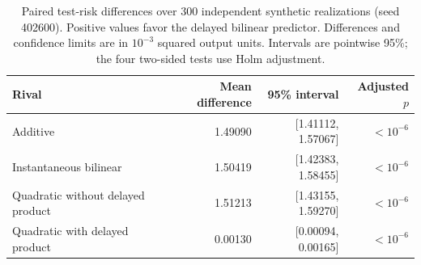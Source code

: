 \begin{table}[htbp]\centering\small
\caption{Paired test-risk differences over 300 independent synthetic realizations (seed 402600). Positive values favor the delayed bilinear predictor. Differences and confidence limits are in $10^{-3}$ squared output units. Intervals are pointwise 95\%; the four two-sided tests use Holm adjustment.}\label{tab:mse-ci}
\begin{tabularx}{\linewidth}{@{}Yrrr@{}}\toprule
Rival & Mean difference & 95\% interval & Adjusted $p$\\\midrule
Additive & 1.49090 & [1.41112, 1.57067] & $<10^{-6}$\\
Instantaneous bilinear & 1.50419 & [1.42383, 1.58455] & $<10^{-6}$\\
Quadratic without delayed product & 1.51213 & [1.43155, 1.59270] & $<10^{-6}$\\
Quadratic with delayed product & 0.00130 & [0.00094, 0.00165] & $<10^{-6}$\\
\bottomrule\end{tabularx}\end{table}
